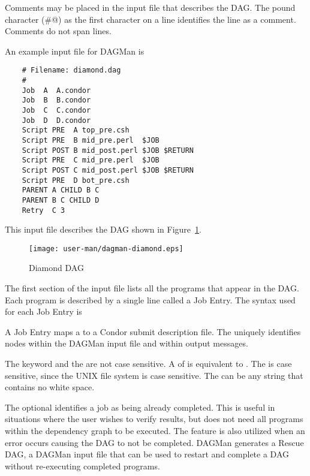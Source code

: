 Comments may be placed in the input file that describes the DAG.
The pound character (\verb@#@) as the first character on a
line identifies the line as a comment.
Comments do not span lines.

An example input file for DAGMan is

\begin{verbatim}
	# Filename: diamond.dag
	#
	Job  A  A.condor 
	Job  B  B.condor 
	Job  C  C.condor	
	Job  D  D.condor
	Script PRE  A top_pre.csh
	Script PRE  B mid_pre.perl  $JOB
	Script POST B mid_post.perl $JOB $RETURN
	Script PRE  C mid_pre.perl  $JOB
	Script POST C mid_post.perl $JOB $RETURN
	Script PRE  D bot_pre.csh
	PARENT A CHILD B C
	PARENT B C CHILD D
	Retry  C 3
\end{verbatim}

This input file describes the DAG shown in 
Figure~\ref{fig:dagman-diamond}.

\begin{figure}[hbt]
\centering
\texttt{[image: user-man/dagman-diamond.eps]}
\caption{\label{fig:dagman-diamond}Diamond DAG}
\end{figure}



The first section of the input file lists
all the programs that appear in the DAG.
Each program is described by a single line called a Job Entry.
The syntax used for each Job Entry is

   

A Job Entry maps a  to a Condor submit description file.
The  uniquely identifies nodes within the
DAGMan input file and within output messages.

The keyword  and the  are not case sensitive.
A  of  is equivalent to .
The  is case sensitive, since
the UNIX file system is case sensitive.
The  can be any string that contains no white space.

The optional  identifies a job as being already
completed.
This is useful in situations where the user wishes to verify results,
but does not need all programs within the dependency graph to be executed.
The  feature is also utilized when
an error occurs causing the DAG to not be completed.
DAGMan generates a Rescue DAG, a DAGMan input file that can be
used to restart and complete a DAG without re-executing
completed programs.

